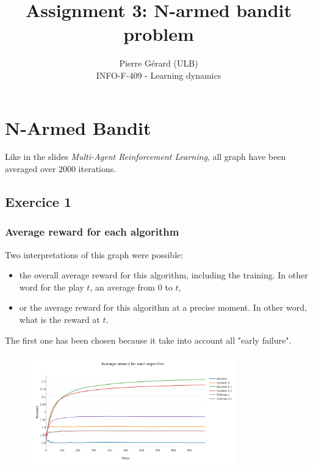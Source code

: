 \documentclass[11pt]{article}
\begin{document}
 
 
\setlength\parindent{0pt}
 
\title{Assignment 3: N-armed bandit problem}%
\author{Pierre Gérard (ULB)\\ %
INFO-F-409 - Learning dynamics} %
 
\maketitle

\section{N-Armed Bandit}
Like in the slides \textit{Multi-Agent Reinforcement Learning}, all graph have been averaged over 2000 iterations.


\subsection{Exercice 1}

\subsubsection{Average reward for each algorithm}

Two interpretations of this graph were possible:
\begin{itemize}
	\item the overall average reward for this algorithm, including the training. In other word for the play $t$, an average from $0$ to $t$,
	\item or the average reward for this algorithm at a precise moment. In other word, what is the reward at $t$.
\end{itemize}
The first one has been chosen because it take into account all "early failure".

\begin{figure}[H]
   \centering
   \includegraphics[width=0.8\textwidth]{img/1-1/reward.png}
\end{figure}
\end{document}
